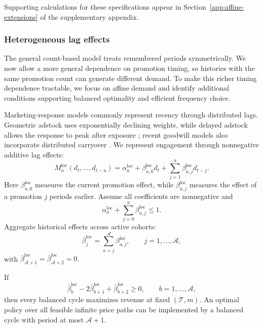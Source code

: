 Supporting calculations for these specifications appear in Section~\ref{app:affine-extensions} of the supplementary appendix.
\par\endgroup

\begingroup\color{black}
\subsubsection{Heterogeneous lag effects}
\label{sec:affine-location-dependent}
The general count-based model treats remembered periods symmetrically. We now allow a more general dependence on promotion timing, so histories with the same promotion count can generate different demand. To make this richer timing dependence tractable, we focus on affine demand and identify additional conditions supporting balanced optimality and efficient frequency choice.

Marketing-response models commonly represent recency through distributed lags. Geometric adstock uses exponentially declining weights, while delayed adstock allows the response to peak after exposure \citep{jin2017mmm}; recent goodwill models also incorporate distributed carryover \citep{gozzi2024advertising}. We represent engagement through nonnegative additive lag effects:
\begin{equation}\label{eq:pd-model}
 M_a^{\mathrm{loc}}(d_t,\ldots,d_{t-a})
 =\alpha_a^{\mathrm{loc}}+\beta_{a,0}^{\mathrm{loc}}d_t
 +\sum_{j=1}^{a}\beta_{a,j}^{\mathrm{loc}}d_{t-j}.
\end{equation}
Here \(\beta_{a,0}^{\mathrm{loc}}\) measures the current promotion effect, while \(\beta_{a,j}^{\mathrm{loc}}\) measures the effect of a promotion \(j\) periods earlier. Assume all coefficients are nonnegative and
\[
 \alpha_a^{\mathrm{loc}}+\sum_{j=0}^{a}\beta_{a,j}^{\mathrm{loc}}\le1.
\]
Aggregate historical effects across active cohorts:
\[
 \bar\beta_j^{\mathrm{loc}}=\sum_{a=j}^{\mathcal A}\beta_{a,j}^{\mathrm{loc}},
 \qquad j=1,\ldots,\mathcal A,
\]
with \(\bar\beta_{\mathcal A+1}^{\mathrm{loc}}=\bar\beta_{\mathcal A+2}^{\mathrm{loc}}=0\).

\begin{samepage}
\begin{proposition}
\label{thm:pd-balanced}
If
\begin{equation}\label{eq:loc-beta-convex}
 \bar\beta_b^{\mathrm{loc}}-2\bar\beta_{b+1}^{\mathrm{loc}}
 +\bar\beta_{b+2}^{\mathrm{loc}}\ge0,
 \qquad b=1,\ldots,\mathcal A,
\end{equation}
\begingroup\color{black}
then every balanced cycle maximizes revenue at fixed \((\mathcal T,m)\). An optimal policy over all feasible infinite price paths can be implemented by a balanced cycle with period at most \(\mathcal A+1\).
\par\endgroup
\end{proposition}
\end{samepage}

